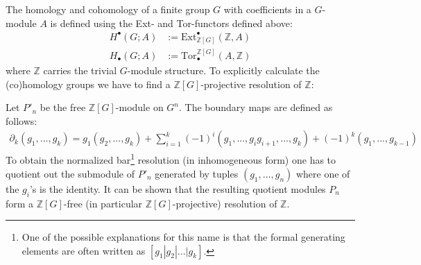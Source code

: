 	The homology and cohomology of a finite group $G$ with coefficients in a $G$-module $A$ is defined using the Ext- and Tor-functors defined above:
	\begin{align}
		H^\bullet(G; A) &:= \text{Ext}_{\mathbb{Z}[G]}^\bullet(\mathbb{Z}, A)\\
		H_\bullet(G; A) &:= \text{Tor}^{\mathbb{Z}[G]}_\bullet(A, \mathbb{Z})
	\end{align}
	where $\mathbb{Z}$ carries the trivial $G$-module structure. To explicitly calculate the (co)homology groups we have to find a $\mathbb{Z}[G]$-projective resolution of $\mathbb{Z}$:
	\begin{construct}
		Let $P'_n$ be the free $\mathbb{Z}[G]$-module on $G^n$. The boundary maps are defined as follows:
		\begin{gather}
			\label{hom_group_boundary}
			\partial_k(g_1, ..., g_k) = g_1(g_2, ..., g_k) + \sum_{i=1}^k (-1)^i(g_1, ..., g_ig_{i+1}, ..., g_k) + (-1)^k (g_1, ..., g_{k-1})
		\end{gather}
		To obtain the normalized bar\footnote{One of the possible explanations for this name is that the formal generating elements are often written as $[g_1|g_2|...|g_k]$.} resolution (in inhomogeneous form) one has to quotient out the submodule of $P'_n$ generated by tuples $(g_1,..., g_n)$ where one of the $g_i$'s is the identity. It can be shown that the resulting quotient modules $P_n$ form a $\mathbb{Z}[G]$-free (in particular $\mathbb{Z}[G]$-projective) resolution of $\mathbb{Z}$.
	\end{construct}

